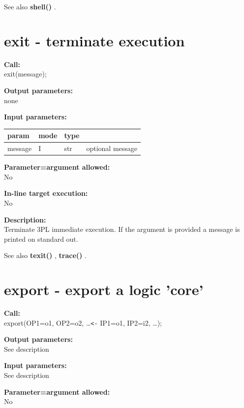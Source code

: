         See also {\bf shell()} .


    \section{exit - terminate execution}\label{sec:ipexit}
        
        {\bf Call:} \\
        exit(message);
        
        {\bf Output parameters:} \\
        none
        
        {\bf Input parameters:} \\
        \begin{tabular}{| l | l | l | l |}
        \hline
        param  & mode     & type  & \\
        \hline \hline
        message & I & str & optional message   \\ \hline
        \end{tabular}
        
        {\bf Parameter=argument allowed:} \\
        No
        
        {\bf In-line target execution:} \\
        No
        
        {\bf Description:} \\
        Terminate 3PL immediate execution. If the argument is provided
        a message is printed on standard out.

        See also {\bf texit()} , {\bf trace()} .


    \section{export - export a logic 'core'}\label{sec:ipexport}
        
        {\bf Call:} \\
        export(OP1=o1, OP2=o2, \dots \verb'<-' IP1=o1, IP2=i2, \dots);
        
        {\bf Output parameters:} \\
        See description
        
        {\bf Input parameters:} \\
        See description
        
        {\bf Parameter=argument allowed:} \\
        No
        
